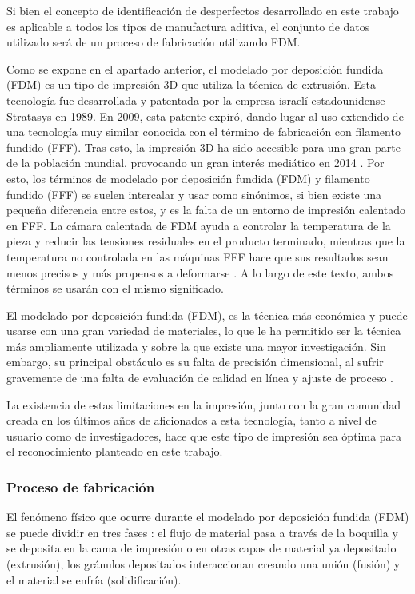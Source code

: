 \documentclass{report}
\begin{document}
Si bien el concepto de identificación de desperfectos desarrollado en este trabajo es aplicable a todos los tipos de manufactura aditiva, el conjunto de datos utilizado será de un proceso de fabricación utilizando FDM. 

Como se expone en el apartado anterior, el modelado por deposición fundida (FDM) es un tipo de impresión 3D que utiliza la técnica de extrusión. Esta tecnología fue desarrollada y patentada por la empresa israelí-estadounidense Stratasys en 1989. En 2009, esta patente expiró, dando lugar al uso extendido de una tecnología muy similar conocida con el término de fabricación con filamento fundido (FFF). Tras esto, la impresión 3D ha sido accesible para una gran parte de la población mundial, provocando un gran interés mediático en 2014 \cite{AMFFFHistory}. Por esto, los términos de modelado por deposición fundida (FDM) y filamento fundido (FFF) se suelen intercalar y usar como sinónimos, si bien existe una pequeña diferencia entre estos, y es la falta de un entorno de impresión calentado en FFF. La cámara calentada de FDM ayuda a controlar la temperatura de la pieza y reducir las tensiones residuales en el producto terminado, mientras que la temperatura no controlada en las máquinas FFF hace que sus resultados sean menos precisos y más propensos a deformarse \cite{AMFFFDiference}.
A lo largo de este texto, ambos términos se usarán con el mismo significado.

El modelado por deposición fundida (FDM), es la técnica más económica y puede usarse con una gran variedad de materiales, lo que le ha permitido ser la técnica más ampliamente utilizada y sobre la que existe una mayor investigación. Sin embargo, su principal obstáculo es su falta de precisión dimensional, al sufrir gravemente de una falta de evaluación de calidad en línea y ajuste de proceso \cite{AMDataset}. 

La existencia de estas limitaciones en la impresión, junto con la gran comunidad creada en los últimos años de aficionados a esta tecnología, tanto a nivel de usuario como de investigadores, hace que este tipo de impresión sea óptima para el reconocimiento planteado en este trabajo.


\subsubsection{Proceso de fabricación}

El fenómeno físico que ocurre durante el modelado por deposición fundida (FDM) se puede dividir en tres fases \cite{AMFFFProcess}: el flujo de material pasa a través de la boquilla y se deposita en la cama de impresión o en otras capas de material ya depositado (extrusión), los gránulos depositados interaccionan creando una unión (fusión) y el material se enfría (solidificación).
\end{document}

